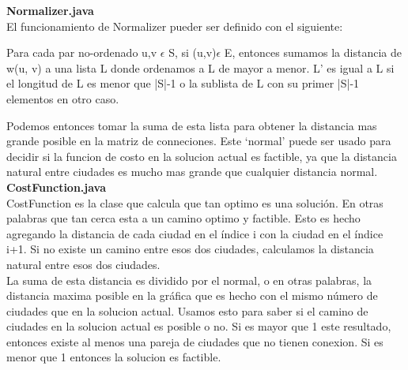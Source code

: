 \documentclass{article}
\begin{document}
    \textbf{Normalizer.java} \\
    El funcionamiento de Normalizer pueder ser definido con el siguiente:
    \begin{center}
    Para cada par no-ordenado u,v $\epsilon$ S, si (u,v)$\epsilon$ E, entonces sumamos la distancia de w(u, v)
    a una lista L donde ordenamos a L de mayor a menor. L' es igual a L si el longitud de L es menor que
    |S|-1 o la sublista de L con su primer |S|-1 elementos en otro caso.
    \end{center}
    Podemos entonces tomar la suma de esta lista para obtener la distancia mas grande posible en la
    matriz de conneciones. Este `normal' puede ser usado para decidir si la funcion de costo en la solucion
    actual es factible, ya que la distancia natural entre ciudades es mucho mas grande que cualquier distancia 
    normal.\\
    
    
    \textbf{CostFunction.java} \\
      CostFunction es la clase que calcula que tan optimo es una solución. En otras palabras que tan cerca
    esta a un camino optimo y factible. Esto es hecho agregando la distancia de cada ciudad en el índice i
    con la ciudad en el índice i+1. Si no existe un camino entre esos dos ciudades, calculamos la distancia
    natural entre esos dos ciudades. \\
    
    La suma de esta distancia es dividido por el normal, o en otras palabras, la distancia maxima posible
    en la gráfica que es hecho con el mismo número de ciudades que en la solucion actual. Usamos esto para saber
    si el camino de ciudades en la solucion actual es posible o no. Si es mayor que 1 este resultado, entonces
    existe al menos una pareja de ciudades que no tienen conexion. Si es menor que 1 entonces la solucion es
    factible.\\
    
\end{document}
